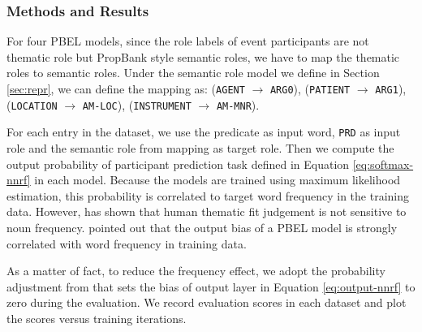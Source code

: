 \documentclass[a4paper]{article}
\begin{document}
\subsubsection{Methods and Results}  \label{sec:method-thematic}
For four PBEL models, since the role labels of event participants are not thematic role but PropBank style semantic roles, we have to map the thematic roles to semantic roles. Under the semantic role model we define in Section \ref{sec:repr}, we can define the mapping as: (\texttt{AGENT} $\to$ \texttt{ARG0}), (\texttt{PATIENT} $\to$ \texttt{ARG1}), (\texttt{LOCATION} $\to$ \texttt{AM-LOC}), (\texttt{INSTRUMENT} $\to$ \texttt{AM-MNR}). 

For each entry in the dataset, we use the predicate as input word, \texttt{PRD} as input role and the semantic role from mapping as target role. Then we compute the output probability of participant prediction task defined in Equation \eqref{eq:softmax-nnrf} in each model. Because the models are trained using maximum likelihood estimation, this probability is correlated to target word frequency in the training data. However, \citet{greenberg2015verb} has shown that human thematic fit judgement is not sensitive to noun frequency. \citet{tilk2016event} pointed out that the output bias of a PBEL model is strongly correlated with word frequency in training data. 



As a matter of fact, to reduce the frequency effect, we adopt the probability adjustment from  that sets the bias of output layer in Equation \eqref{eq:output-nnrf} to zero during the evaluation. We record evaluation scores in each dataset and plot the scores versus training iterations. 
\end{document}
